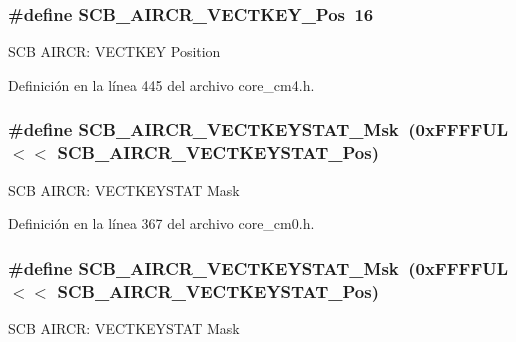 \subsubsection[{\texorpdfstring{S\+C\+B\+\_\+\+A\+I\+R\+C\+R\+\_\+\+V\+E\+C\+T\+K\+E\+Y\+\_\+\+Pos}{SCB_AIRCR_VECTKEY_Pos}}]{\setlength{\rightskip}{0pt plus 5cm}\#define S\+C\+B\+\_\+\+A\+I\+R\+C\+R\+\_\+\+V\+E\+C\+T\+K\+E\+Y\+\_\+\+Pos~16}\hypertarget{group___c_m_s_i_s___s_c_b_gaaa27c0ba600bf82c3da08c748845b640}{}\label{group___c_m_s_i_s___s_c_b_gaaa27c0ba600bf82c3da08c748845b640}
S\+CB A\+I\+R\+CR\+: V\+E\+C\+T\+K\+EY Position 

Definición en la línea 445 del archivo core\+\_\+cm4.\+h.

\subsubsection[{\texorpdfstring{S\+C\+B\+\_\+\+A\+I\+R\+C\+R\+\_\+\+V\+E\+C\+T\+K\+E\+Y\+S\+T\+A\+T\+\_\+\+Msk}{SCB_AIRCR_VECTKEYSTAT_Msk}}]{\setlength{\rightskip}{0pt plus 5cm}\#define S\+C\+B\+\_\+\+A\+I\+R\+C\+R\+\_\+\+V\+E\+C\+T\+K\+E\+Y\+S\+T\+A\+T\+\_\+\+Msk~(0x\+F\+F\+F\+F\+U\+L $<$$<$ S\+C\+B\+\_\+\+A\+I\+R\+C\+R\+\_\+\+V\+E\+C\+T\+K\+E\+Y\+S\+T\+A\+T\+\_\+\+Pos)}\hypertarget{group___c_m_s_i_s___s_c_b_gabacedaefeefc73d666bbe59ece904493}{}\label{group___c_m_s_i_s___s_c_b_gabacedaefeefc73d666bbe59ece904493}
S\+CB A\+I\+R\+CR\+: V\+E\+C\+T\+K\+E\+Y\+S\+T\+AT Mask 

Definición en la línea 367 del archivo core\+\_\+cm0.\+h.

\subsubsection[{\texorpdfstring{S\+C\+B\+\_\+\+A\+I\+R\+C\+R\+\_\+\+V\+E\+C\+T\+K\+E\+Y\+S\+T\+A\+T\+\_\+\+Msk}{SCB_AIRCR_VECTKEYSTAT_Msk}}]{\setlength{\rightskip}{0pt plus 5cm}\#define S\+C\+B\+\_\+\+A\+I\+R\+C\+R\+\_\+\+V\+E\+C\+T\+K\+E\+Y\+S\+T\+A\+T\+\_\+\+Msk~(0x\+F\+F\+F\+F\+U\+L $<$$<$ S\+C\+B\+\_\+\+A\+I\+R\+C\+R\+\_\+\+V\+E\+C\+T\+K\+E\+Y\+S\+T\+A\+T\+\_\+\+Pos)}\hypertarget{group___c_m_s_i_s___s_c_b_gabacedaefeefc73d666bbe59ece904493}{}\label{group___c_m_s_i_s___s_c_b_gabacedaefeefc73d666bbe59ece904493}
S\+CB A\+I\+R\+CR\+: V\+E\+C\+T\+K\+E\+Y\+S\+T\+AT Mask 

